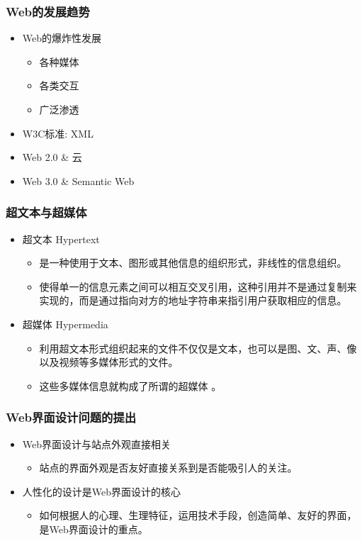 \documentclass{beamer}
\begin{document}
\begin{frame}
	\frametitle{Web的发展趋势}
	\beamertemplatetransparentcovereddynamicmedium
	\begin{itemize}
		\item Web的爆炸性发展
		\begin{itemize}
			\item 各种媒体
			\item 各类交互
			\item 广泛渗透 
		\end{itemize}
		\pause
		\item W3C标准: XML
		\pause
		\item Web 2.0 \& 云
		\pause
		\item Web 3.0 \& Semantic Web
	\end{itemize}
\end{frame}

\begin{frame}
	\frametitle{超文本与超媒体}
	\beamertemplatetransparentcovereddynamicmedium
	\begin{itemize}
		\item 超文本 Hypertext
		\begin{itemize}
			\item 是一种使用于文本、图形或其他信息的组织形式，非线性的信息组织。
			\item 使得单一的信息元素之间可以相互交叉引用，这种引用并不是通过复制来实现的，而是通过指向对方的地址字符串来指引用户获取相应的信息。 
		\end{itemize}
		\pause
		\item 超媒体 Hypermedia
		\begin{itemize}
			\item 利用超文本形式组织起来的文件不仅仅是文本，也可以是图、文、声、像以及视频等多媒体形式的文件。
			\item 这些多媒体信息就构成了所谓的超媒体 。
		\end{itemize}
	\end{itemize}
\end{frame}

\begin{frame}
	\frametitle{Web界面设计问题的提出}
	\beamertemplatetransparentcovereddynamicmedium
	\begin{itemize}[<+->]
		\item Web界面设计与站点外观直接相关
		\begin{itemize}
			\item 站点的界面外观是否友好直接关系到是否能吸引人的关注。
		\end{itemize}
		\pause
		\item 人性化的设计是Web界面设计的核心
		\begin{itemize}
			\item 如何根据人的心理、生理特征，运用技术手段，创造简单、友好的界面，是Web界面设计的重点。
		\end{itemize}
	\end{itemize}
\end{frame}
\end{document}
